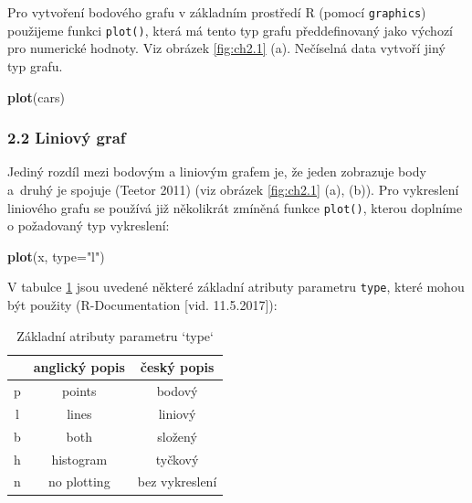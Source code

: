 \documentclass[12pt,]{article}
\newenvironment{Shaded}{\begin{snugshade}}{\end{snugshade}}
\newcommand{\KeywordTok}[1]{\textcolor[rgb]{0.13,0.29,0.53}{\textbf{#1}}}
\newcommand{\DataTypeTok}[1]{\textcolor[rgb]{0.13,0.29,0.53}{#1}}
\newcommand{\StringTok}[1]{\textcolor[rgb]{0.31,0.60,0.02}{#1}}
\newcommand{\NormalTok}[1]{#1}
\begin{document}
\qquad Pro vytvoření bodového grafu v základním prostředí R (pomocí
\texttt{graphics}) použijeme funkci \texttt{plot()}, která má tento typ
grafu předdefinovaný jako výchozí pro numerické hodnoty. Viz obrázek
\ref{fig:ch2.1} (a). Nečíselná data vytvoří jiný typ grafu.

\begin{Shaded}
\begin{Highlighting}[]
\KeywordTok{plot}\NormalTok{(cars)}
\end{Highlighting}
\end{Shaded}

\subsubsection{2.2 Liniový graf}\label{liniovy-graf}

\qquad Jediný rozdíl mezi bodovým a liniovým grafem je, že jeden
zobrazuje body a~druhý je spojuje (Teetor 2011) (viz obrázek
\ref{fig:ch2.1} (a), (b)). Pro vykreslení liniového grafu se používá již
několikrát zmíněná funkce \texttt{plot()}, kterou doplníme o požadovaný
typ vykreslení:

\begin{Shaded}
\begin{Highlighting}[]
\KeywordTok{plot}\NormalTok{(x, }\DataTypeTok{type=}\StringTok{"l"}\NormalTok{)}
\end{Highlighting}
\end{Shaded}

V tabulce \ref{tab1} jsou uvedené některé základní atributy parametru
\texttt{type}, které mohou být použity (R-Documentation {[}vid.
11.5.2017{]}):

\begin{table}[H]
\centering
\begin{tabular}{|c|c|c|}
\hline
  & anglický popis & český popis    \\ \hline
p & points         & bodový         \\ \hline
l & lines          & liniový        \\ \hline
b & both           & složený        \\ \hline
h & histogram      & tyčkový        \\ \hline
n & no plotting    & bez vykreslení \\ \hline
\end{tabular}
\caption{Základní atributy parametru `type`}
\label{tab1}
\end{table}
\end{document}
